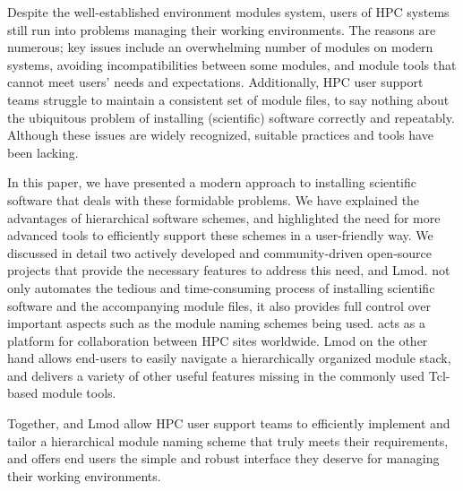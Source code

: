 Despite the well-established environment modules system, users of HPC systems still
run into problems managing their working environments. The reasons are numerous; key
issues include an overwhelming number of modules on modern systems, avoiding
incompatibilities between some modules, and module tools that cannot meet users' needs 
and expectations. Additionally, HPC user support teams struggle to maintain a
consistent set of module files, to say nothing about the ubiquitous problem of
installing (scientific) software correctly and repeatably. Although these issues are
widely recognized, suitable practices and tools have been lacking.

In this paper, we have presented a modern approach to installing scientific software
that deals with these formidable problems. We have explained the advantages of
hierarchical software schemes, and highlighted the need for more advanced tools to
efficiently support these schemes in a user-friendly way. We discussed in detail two
actively developed and community-driven open-source projects that provide the
necessary features to address this need, \easybuild{} and Lmod. \easybuild{} not only
automates the tedious and time-consuming process of installing scientific software
and the accompanying module files, it also provides full control over important
aspects such as the module naming schemes being used. \easybuild{} acts as a platform
for collaboration between HPC sites worldwide. Lmod on the other hand allows end-users
to easily navigate a hierarchically organized module stack, and delivers a variety of
other useful features missing in the commonly used Tcl-based module tools.

Together, \easybuild{} and Lmod allow HPC user support teams to efficiently implement
and tailor a hierarchical module naming scheme that truly meets their requirements,
and offers end users the simple and robust interface they deserve for managing their
working environments.
